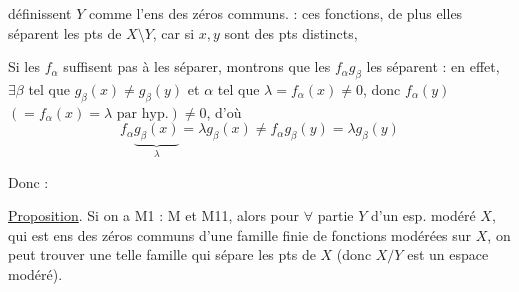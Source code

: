 
définissent $Y$ comme l'ens des zéros communs.  : ces fonctions, de plus elles séparent les pts de $X\setminus Y$, car si $x,y$ sont des pts distincts, 

Si les $f_\alpha$  suffisent pas à les séparer, montrons que les $f_\alpha g_\beta$ les séparent : en effet, $\exists\beta$ tel que $g_\beta(x)\ne g_\beta(y)$  et $\alpha$ tel que $\lambda=f_\alpha(x)\ne0$, donc $f_\alpha(y)$ $(=f_\alpha(x)=\lambda\text{ par hyp.})\ne0$, d'où
\[
f_\alpha\underbrace{g_\beta(x)}_{\lambda}=\lambda g_\beta(x)\ne f_\alpha g_\beta(y)=\lambda g_\beta(y)
\]

Donc :

\uline{Proposition}. Si on a M1 : M et M11, alors pour $\forall$ partie   $Y$ d'un esp. modéré $X$, qui est ens des zéros communs d'une famille finie de fonctions modérées sur $X$, on peut trouver une telle famille qui sépare les pts de $X$ (donc $X/Y$ est un espace modéré).

